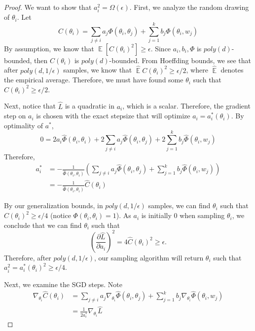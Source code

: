 \documentclass{article}
\DeclareMathOperator*{\expt}{\mathbb{E}}
\newcommand{\pd}[2]{\frac{\partial#1}{\partial#2}}
\begin{document}
\begin{proof}
We want to show that $a_i^2 = \Omega(\epsilon)$. First, we analyze the random drawing of $\theta_i$.  Let 
%
\[  C(\theta_i) = \sum_{j\neq i} a_j \Phi(\theta_i,\theta_j) + \sum_{j=1}^k b_j \Phi(\theta_i,w_j)\]
%
By assumption, we know that $\expt[C(\theta_i)^2] \geq
\epsilon$.
Since $a_i,b_i, \Phi$ is $poly(d)$-bounded, then $C(\theta_i)$ is
$poly(d)$-bounded. From Hoeffding bounds, we see that after $poly(d,1/\epsilon)$ samples, we know that $\hat{\expt}C(\theta_i)^2 \geq \epsilon/2$, where $\hat{\expt}$ denotes the empirical average. Therefore, we must have found some $\theta_i$ such that $C(\theta_i)^2 \geq \epsilon/2$. 


Next, notice that $\hat{L}$ is a quadratic in $a_i$, which is a scalar. Therefore, the gradient
step on $a_i$ is chosen with the exact stepsize that will optimize
$a_i = a_i^*(\theta_i)$.  By optimality of $a^*$, 
%
\begin{equation}
0 = 2a_i \widehat{\Phi}(\theta_i,\theta_i) + 2\sum_{j\neq i} a_j \widehat{\Phi}(\theta_i,\theta_j) + 2\sum_{j=1}^k b_j \widehat{\Phi}(\theta_i,w_j)
\end{equation} 
%
Therefore, 
%
\begin{align*}
 a_i^* & = - \frac{1}{\widehat{\Phi}(\theta_i,\theta_i)} (\sum_{j\neq i} a_j \widehat{\Phi}(\theta_i,\theta_j) + \sum_{j=1}^k b_j \widehat{\Phi}(\theta_i,w_j)) \\
& = -\frac{1}{\widehat{\Phi}(\theta_i,\theta_i)}\widehat{C}(\theta_i) 
\end{align*}


By our generalization bounds, in $poly(d,1/\epsilon)$ samples, we can
find $\theta_i$ such that $\widehat{C}(\theta_i)^2 \geq \epsilon/4$
(notice $\Phi(\theta_i,\theta_i) = 1$). As $a_i$ is initially $0$ when sampling $\theta_i$, we conclude
that we can find $\theta_i$ such that
%
\[ \left( \pd{\hat{L}}{a_i} \right)^2 = 4 \widehat{C}(\theta_i)^2 \geq \epsilon.\]
Therefore, after $poly(d,1/\epsilon)$, our sampling algorithm will return $\theta_i$ such that $a_i^2 = a_i^*(\theta_i)^2 \geq \epsilon /4$. 

Next, we examine the SGD steps. Note
%
\begin{align*}
\nabla_{\theta_i} \widehat{C}(\theta_i) & =  \sum_{j\neq i} a_j \nabla_{\theta_i}\widehat{\Phi}(\theta_i,\theta_j) + \sum_{j=1}^k b_j \nabla_{\theta_i}\widehat{\Phi}(\theta_i,w_j) \\
& = \frac{1}{2a_i^*} \nabla_{\theta_i}\widehat{L}
\end{align*}


\end{proof}
\end{document}
